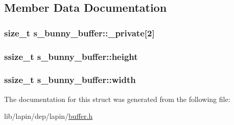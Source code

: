 \subsection{Member Data Documentation}
\hypertarget{structs__bunny__buffer_a53ac3ca3b001db541dc8e42064fa8277}{
\subsubsection[{\-\_\-private}]{ {\bf size\-\_\-t} s\-\_\-bunny\-\_\-buffer\-::\-\_\-private\mbox{[}2\mbox{]}}}\label{structs__bunny__buffer_a53ac3ca3b001db541dc8e42064fa8277}
\hypertarget{structs__bunny__buffer_aa3b7e2d62d9dba94ed7ab6ccd23a4fdc}{
\subsubsection[{height}]{\setlength{\rightskip}{0pt plus 5cm}ssize\-\_\-t s\-\_\-bunny\-\_\-buffer\-::height}}\label{structs__bunny__buffer_aa3b7e2d62d9dba94ed7ab6ccd23a4fdc}
\hypertarget{structs__bunny__buffer_a9bfe790b1cffeea4e4345d05d9026fc8}{
\subsubsection[{width}]{\setlength{\rightskip}{0pt plus 5cm}ssize\-\_\-t s\-\_\-bunny\-\_\-buffer\-::width}}\label{structs__bunny__buffer_a9bfe790b1cffeea4e4345d05d9026fc8}


The documentation for this struct was generated from the following file\-:\begin{DoxyCompactItemize}
\item 
lib/lapin/dep/lapin/\hyperlink{buffer_8h}{buffer.\-h}\end{DoxyCompactItemize}
